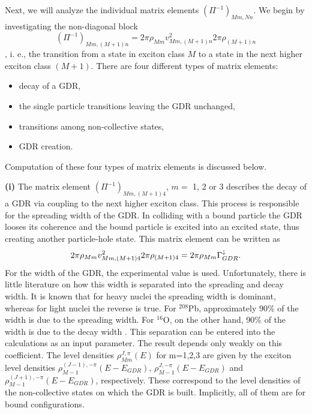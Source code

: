 Next, we will analyze the individual matrix elements $(\Pi^{-1})_{Mm,Nn}$.
We begin by investigating the non-diagonal block \[(\Pi^{-1})_{Mm,(M+1)n}=2%
\pi\rho_{Mm}v_{Mm,(M+1)n}^{2}2\pi\rho_{(M+1)n}\], i. e., the transition from
a state in exciton class $M$ to a state in the next higher exciton class $%
(M+1)$. There are four different types of matrix elements:

\begin{itemize}
\item decay of a GDR,

\item the single particle transitions leaving the GDR unchanged,

\item transitions among non-collective states,

\item GDR creation.
\end{itemize}

Computation of these four types of matrix elements is discussed below.

\smallskip \textbf{(i)} The matrix element $(\Pi^{-1})_{Mm,(M+1)4}$, $m=$ 1,
2 or 3 describes the decay of a GDR via coupling to the next higher exciton
class. This process is responsible for the spreading width of the GDR. In
colliding with a bound particle the GDR looses its coherence and the bound
particle is excited into an excited state, thus creating another
particle-hole state. This matrix element can be written as
\begin{equation}
2\pi\rho_{Mm}v_{Mm,(M+1)4}^{2}2\pi\rho_{(M+1)4}=2\pi\rho_{Mm}\Gamma_{GDR}^{%
\downarrow}.
\end{equation}
For the width of the GDR, the experimental value is used. Unfortunately,
there is little literature on how this width is separated into the
spreading and
decay width. It is known that for heavy nuclei the spreading width is
dominant, whereas for light nuclei the reverse is true. For $^{208}$Pb,
approximately 90\% of the width is due to the spreading width. For $^{16}$O,
on the other hand, 90\% of the width is due to the decay width \cite{BBB83}.
This separation can be entered into the calculations as an input parameter.
The result depends only weakly on this coefficient. The level densities
$\rho_{Mm}^{J,\pi}(E)$ for m=1,2,3 are given by
the exciton level densities $\rho_{M-1}^{(J-1),-\pi}(E-E_{GDR})$, $%
\rho_{M-1}^{J,-\pi}(E-E_{GDR})$ and $\rho_{M-1}^{(J+1),-\pi}(E-E_{GDR})$,
respectively. These correspond to the level densities of the non-collective
states on which the GDR is built. Implicitly, all of them are for bound
configurations.

